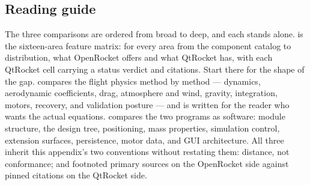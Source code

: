 \subsection{Reading guide}\label{app:or-context-guide}

The three comparisons are ordered from broad to deep, and each stands alone.
 is the sixteen-area feature matrix: for every area from the
component catalog to distribution, what OpenRocket offers and what QtRocket has, with each
QtRocket cell carrying a status verdict and citations. Start there for the shape of the
gap.  compares the flight physics method by method --- dynamics,
aerodynamic coefficients, drag, atmosphere and wind, gravity, integration, motors,
recovery, and validation posture --- and is written for the reader who wants the actual
equations.  compares the two programs as software: module
structure, the design tree, positioning, mass properties, simulation control, extension
surfaces, persistence, motor data, and GUI architecture. All three inherit this appendix's
two conventions without restating them: distance, not conformance; and footnoted primary
sources on the OpenRocket side against pinned  citations on the QtRocket
side.
